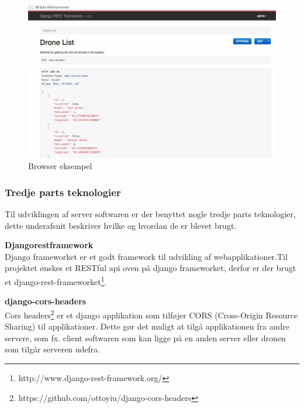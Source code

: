 \begin{figure}[H]
	\centering
	\includegraphics[width=1\textwidth]{Billeder/implementation/browser_eksempel.png}
	\caption{Browser eksempel}
	\label{fig:browser_eksempel}
\end{figure}

\newpage

\subsubsection*{Tredje parts teknologier}
Til udviklingen af server softwaren er der benyttet nogle tredje parts teknologier, dette underafsnit beskriver hvilke og hvordan de er blevet brugt.

\textbf{Djangorestframework}\\
Django frameworket er et godt framework til udvikling af webapplikationer.Til projektet ønskes et RESTful api oven på django frameworket, derfor er der brugt et django-rest-frameworket\footnote{http://www.django-rest-framework.org/}. 

\textbf{django-cors-headers}\\
Cors headers\footnote{https://github.com/ottoyiu/django-cors-headers} er et django applikation som tilføjer CORS (Cross-Origin Resource Sharing) til applikationer. Dette gør det muligt at tilgå applikationen fra andre servere, som fx.  client softwaren som kan ligge på en anden server eller dronen som tilgår serveren udefra. 